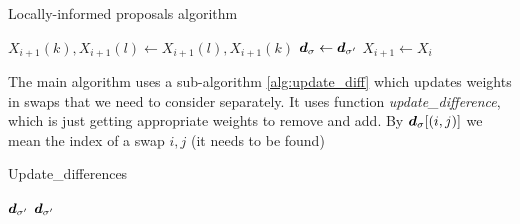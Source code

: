 		\begin{algorithm}[!htb]
			\caption{Locally-informed proposals algorithm}\label{alg:loc_neigh}
			\begin{algorithmic}[1]
				
					
					
					
						\State $X_{i+1}(k), X_{i+1}(l) \gets X_{i+1}(l), X_{i+1}(k)$
						\State $\bm{d}_{\sigma} \gets \bm{d}_{\sigma'}$
					\Else
						\State $X_{i+1} \gets X_i$
					\EndIf
				\EndFor
			\end{algorithmic}
		\end{algorithm}
		
		The main algorithm uses a sub-algorithm \ref{alg:update_diff} which updates weights in swaps that we need to consider separately. It uses function \textit{update\_difference}, which is just getting appropriate weights to remove and add. By $\bm{d}_\sigma[(i,j)]$ we mean the index of a swap $i,j$ (it needs to be found)
		\begin{algorithm}[!htb]
			\caption{Update\_differences}\label{alg:update_diff}
			\begin{algorithmic}[1]
				\Require $\bm{d}_{\sigma'}$
				\Ensure $\bm{d}_{\sigma'}$
						\EndIf
					\EndFor
				\EndFor
			\end{algorithmic}
		\end{algorithm}
		
